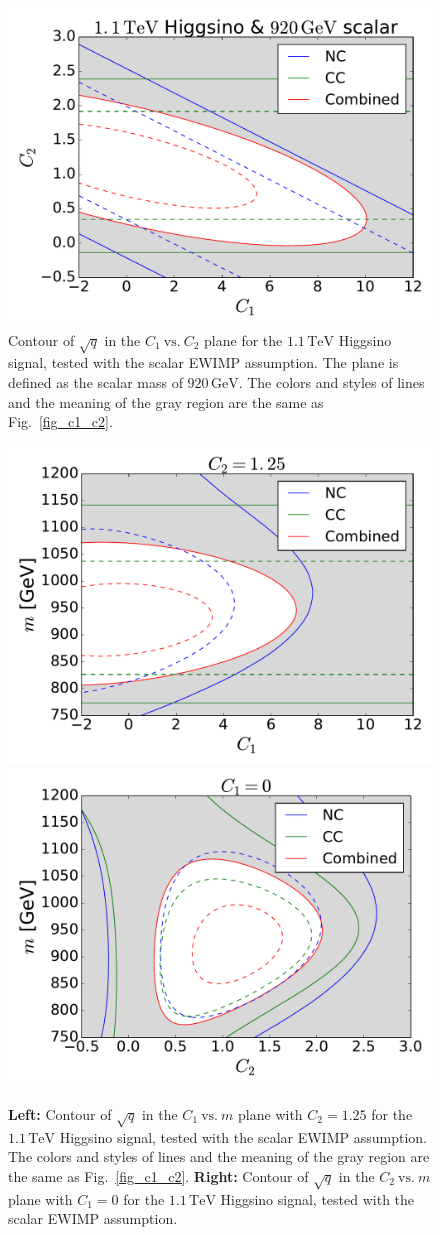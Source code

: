 \documentclass[12pt,twoside,book]{article}
\begin{document}
\begin{figure}[t]
 \centering
 \includegraphics[width=0.5\linewidth]{C1_vs_C2_Higgsino_scalar.pdf}
 \caption{Contour of $\sqrt{q}$ in the $C_1~\mathrm{vs.}~C_2$ plane for
 the $1.1\,\mathrm{TeV}$ Higgsino signal, tested with the scalar EWIMP
 assumption.  The plane is defined as the scalar mass of $920\,\mathrm{GeV}$.
 The colors and styles of lines and the meaning of the gray region are
 the same as Fig.~\ref{fig_c1_c2}.}  \label{fig_c1_c2_scalar}
\end{figure}

\begin{figure}[t]
 \centering
 \includegraphics[width=0.48\linewidth]{C1_vs_mass_Higgsino_scalar.pdf}
 \includegraphics[width=0.48\linewidth]{C2_vs_mass_Higgsino_scalar.pdf}
 \caption{\textbf{Left:} Contour of $\sqrt{q}$ in the
 $C_1~\mathrm{vs.}~m$ plane with $C_2 = 1.25$ for the $1.1\,\mathrm{TeV}$ Higgsino signal,
 tested with the scalar EWIMP assumption.
 The colors and styles of lines and the meaning of the gray
 region are the same as Fig.~\ref{fig_c1_c2}.  \textbf{Right:} Contour
 of $\sqrt{q}$ in the $C_2~\mathrm{vs.}~m$ plane with $C_1 = 0$ for the
 $1.1\,\mathrm{TeV}$ Higgsino signal, tested with the scalar EWIMP
 assumption.} \label{fig_c1_m_scalar}
\end{figure}
\end{document}
